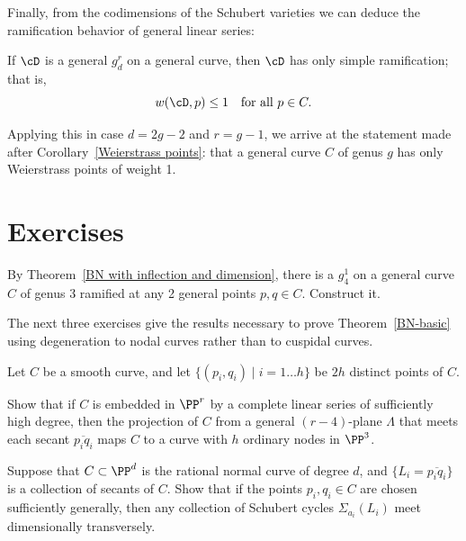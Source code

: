 Finally, from the codimensions of the Schubert varieties  we can deduce
the ramification behavior of general
linear series:

\begin{theorem}
If $\cD$ is a general $g^r_d$ on a general curve, then $\cD$ has only
%
%
simple ramification; that is,
$$
w(\cD, p) \leq 1 \quad \text{for all } p \in C.
$$
\end{theorem}

Applying this in case $d=2g-2$ and $r = g-1$, we arrive at the
statement made
after Corollary~\ref{Weierstrass points}:
that a general
curve $C$ of genus $g$ has only Weierstrass points of weight 1.

\section{Exercises}

\begin{exercise}
  By Theorem~\ref{BN with inflection and dimension}, there is a $g^1_4$
  on a general curve $C$ of
genus 3
%
%
ramified at any 2 general points $p, q \in C$. Construct it.
\end{exercise}

The
next
three exercises give the results necessary to prove
Theorem~\ref{BN-basic} using degeneration to
nodal curves
%
rather than to cuspidal curves.

\begin{exercise}
\label{independent secants}
\label{Constructing nodal curves}
Let $C$ be a smooth curve,
and let
 $\{(p_{i}, q_{i}) \mid i = 1\dots h\}$ be $2h$ distinct points of $C$.

Show that if $C$ is embedded in $\PP^{r}$ by a complete linear series
of sufficiently high degree, then the
projection of $C$ from a general $(r-4)$-plane $\Lambda$ that meets each
secant $\overline{p_{i} q_{i}}$
maps $C$ to a curve with $h$ ordinary nodes in $\PP^{3}$.
 \end{exercise}

\begin{exercise}\label{BN via nodal curves}\label{secant general position}
Suppose that $C\subset \PP^{d}$ is the rational normal curve of degree
$d$, and $\{L_{i} = \overline{p_{i}q_{i}}\}$
is a collection of secants of $C$. Show that if the points $p_{i},
q_{i}\in C$ are chosen sufficiently generally,
then any collection of Schubert cycles $\Sigma_{a_{i}}(L_{i})$ meet
dimensionally transversely.
\end{exercise}


